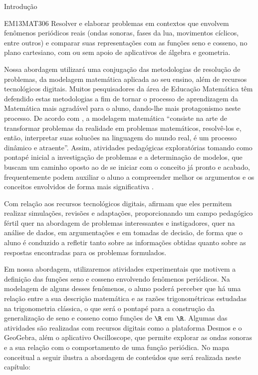 \begin{apresentacao}{Introdução}
\begin{habilities}{EM13MAT306}
Resolver e elaborar problemas em contextos que envolvem fenômenos periódicos reais (ondas sonoras, fases da lua, movimentos cíclicos, entre outros) e comparar suas representações com as funções seno e cosseno, no plano cartesiano, com ou sem apoio de aplicativos de álgebra e geometria.
\end{habilities}

Nossa abordagem utilizará uma conjugação das metodologias de resolução de problemas, da modelagem matemática aplicada ao seu ensino, além de recursos tecnológicos digitais. Muitos pesquisadores da área de Educação Matemática têm defendido estas metodologias a fim de tornar o processo de aprendizagem da Matemática mais agradável para o aluno, dando-lhe mais protagonismo neste processo. De acordo com \cite{bassanezi1999}, a modelagem matemática “consiste na arte de transformar problemas da realidade em problemas matemáticos, resolvê-los e, então, interpretar suas solucões na linguagem do mundo real, é um processo dinâmico e atraente”. Assim, atividades pedagógicas exploratórias tomando como pontapé inicial a investigação de problemas e a determinação de modelos, que buscam um caminho oposto ao de se iniciar com o conceito já pronto e acabado, frequentemente podem auxiliar o aluno a compreender melhor os argumentos e os conceitos envolvidos de forma mais significativa \citep{bassanezi1999}.  

Com relação aos recursos tecnológicos digitais, \cite{ferreira2013} afirmam que eles permitem realizar simulações, revisões e adaptações, proporcionando um campo pedagógico fértil quer na abordagem de problemas interessantes e instigadores, quer na análise de dados, em argumentações e em tomadas de decisão, de forma que o aluno é conduzido a refletir tanto sobre as informações obtidas quanto sobre as respostas encontradas para os problemas formulados. 

Em nossa abordagem, utilizaremos atividades experimentais que motivem a definição das funções seno e cosseno envolvendo fenômenos periódicos. Na modelagem de alguns desses fenômenos, o aluno poderá perceber que há uma relação entre a sua descrição matemática e as razões trigonométricas estudadas na trigonometria clássica, o que será o pontapé para a construção da generalização de seno e cosseno como funções de $\R$ em $\R$. Algumas das atividades são realizadas com recursos digitais como a plataforma Desmos e o GeoGebra, além o aplicativo Oscilloscope, que permite explorar as ondas sonoras e a sua relação com o comportamento de uma função periódica. No mapa conceitual a seguir ilustra a abordagem de conteúdos que será realizada neste capítulo:


\end{apresentacao}

